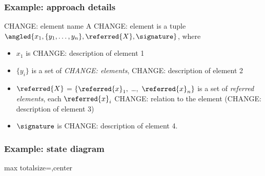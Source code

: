 \begin{frame}
    \frametitle{Example: approach details}
    \begin{block}{CHANGE: element name}
        A \alert{CHANGE: element} is a tuple \alert{$\angled{x_1, \{y_1,\ldots, y_n\}, \referred{X}, \signature}$}, where

        \vspace{1em}

        \begin{itemize}\setlength{\itemsep}{.5em}
            \item \alert{$x_1$} is CHANGE: description of element 1
            \item \alert{$\{y_i\}$} is a set of \emph{CHANGE: elements}, CHANGE: description of element 2
            \item \alert{$\referred{X}$$=$$\{\referred{x}_1,$ \ldots$,$ $\referred{x}_n\}$} is a set of \alert{\emph{referred elements}}, \alert{each} $\referred{x}_i$ \alert{CHANGE: relation to the element} (CHANGE: description of element 3)
            \item \alert{$\signature$} is CHANGE: description of element 4.
        \end{itemize}
    \end{block}

\end{frame}

\begin{frame}
    \frametitle{Example: state diagram}

    \begin{adjustbox}{max totalsize={\linewidth}{\textheight},center}
        
    \end{adjustbox}

\end{frame}
